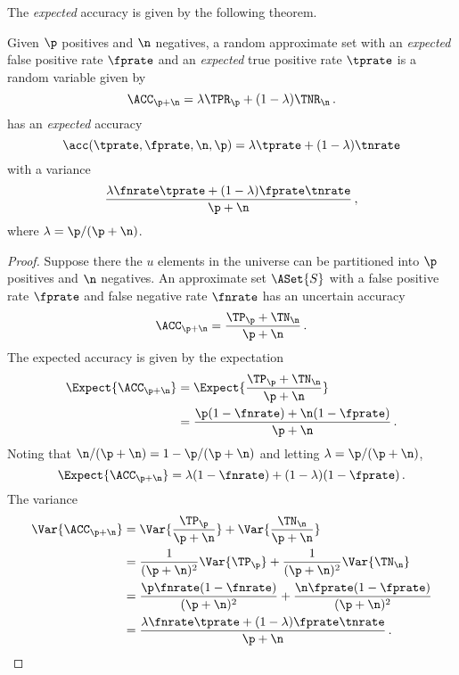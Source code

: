 \documentclass[ ../main.tex]{subfiles}
\begin{document}
The \emph{expected} accuracy is given by the following theorem.
\begin{theorem}
	\label{thm:approx_expected_accuracy}
	Given $\p$ positives and $\n$ negatives, a random approximate set with an 
	\emph{expected} false positive rate $\fprate$ and an \emph{expected} true 
	positive rate $\tprate$ is a random variable given by
	\begin{equation}
	\ACC_{\p + \n} = \lambda \TPR_\p + (1 - \lambda) \TNR_\n\,.
	\end{equation}	
	has an \emph{expected} accuracy
	\begin{equation}
	\label{eq:approx_expected_accuracy}
	\acc(\tprate,\fprate,\n,\p) = \lambda \tprate + (1-\lambda) \tnrate
	\end{equation}
	with a variance
	\begin{equation}
	\frac{\lambda \fnrate \tprate + (1 - \lambda)\fprate 
		\tnrate}{\p+\n}\,,   
	\end{equation}
	where $\lambda = \p / (\p + \n)$.
\end{theorem}
\begin{proof}
	Suppose there the $u$ elements in the universe can be partitioned into $\p$ 
	positives and $\n$ negatives. An approximate set $\ASet{S}$ with a false 
	positive rate $\fprate$ and false negative rate $\fnrate$ has an uncertain 
	accuracy
	\begin{equation}
	\ACC_{\p + \n} = \frac{\TP_\p + \TN_\n}{\p + \n}\,.
	\end{equation}
	The expected accuracy is given by the expectation
	\begin{align}
	\Expect{\ACC_{\p + \n}}
	&= \Expect{\frac{\TP_\p + \TN_\n}{\p + \n}}\\
	&= \frac{\p (1 - \fnrate) + \n (1 - \fprate)}{\p + \n}\,.
	\end{align}
	Noting that $\n/(\p+\n) = 1 - \p/(\p+\n)$ and letting $\lambda = \p/(\p + 
	\n)$,
	\begin{equation}
	\Expect{\ACC_{\p + \n}} = \lambda (1 - \fnrate) + (1 - \lambda) (1 - 
	\fprate)\,.
	\end{equation}
	The variance
	\begin{align}
	\Var{\ACC_{\p + \n}}
	&= \Var{\frac{\TP_\p}{\p + \n}} + \Var{\frac{\TN_\n}{\p + \n}}\\
	&= \frac{1}{(\p + \n)^2}\Var{\TP_\p} + \frac{1}{(\p + \n)^2}\Var{\TN_\n}\\
	&= \frac{\p \fnrate (1 - \fnrate)}{(\p + \n)^2} + \frac{\n \fprate (1 - 
		\fprate)}{(\p + \n)^2}\\
	&= \frac{\lambda \fnrate \tprate + (1 - \lambda)\fprate 
		\tnrate}{\p+\n}\,.
	\end{align}
\end{proof}
\end{document}
